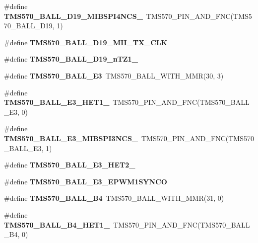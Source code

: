 \begin{DoxyCompactItemize}
\item 
\mbox{\label{tms570lc4357-pins_8h_a776e34c42339fee359bb9077e2f3d977}} 
\#define {\bfseries T\+M\+S570\+\_\+\+B\+A\+L\+L\+\_\+\+D19\+\_\+\+M\+I\+B\+S\+P\+I4\+N\+C\+S\+\_}~T\+M\+S570\+\_\+\+P\+I\+N\+\_\+\+A\+N\+D\+\_\+\+F\+NC(T\+M\+S570\+\_\+\+B\+A\+L\+L\+\_\+\+D19, 1)
\item 
\#define {\bfseries T\+M\+S570\+\_\+\+B\+A\+L\+L\+\_\+\+D19\+\_\+\+M\+I\+I\+\_\+\+T\+X\+\_\+\+C\+LK}
\item 
\#define {\bfseries T\+M\+S570\+\_\+\+B\+A\+L\+L\+\_\+\+D19\+\_\+n\+T\+Z1\+\_}
\item 
\mbox{\label{tms570lc4357-pins_8h_aacdf78b66d5fde059737a66c86631960}} 
\#define {\bfseries T\+M\+S570\+\_\+\+B\+A\+L\+L\+\_\+\+E3}~T\+M\+S570\+\_\+\+B\+A\+L\+L\+\_\+\+W\+I\+T\+H\+\_\+\+M\+MR(30, 3)
\item 
\mbox{\label{tms570lc4357-pins_8h_adb0461589f731e79535d849af9ccc705}} 
\#define {\bfseries T\+M\+S570\+\_\+\+B\+A\+L\+L\+\_\+\+E3\+\_\+\+H\+E\+T1\+\_}~T\+M\+S570\+\_\+\+P\+I\+N\+\_\+\+A\+N\+D\+\_\+\+F\+NC(T\+M\+S570\+\_\+\+B\+A\+L\+L\+\_\+\+E3, 0)
\item 
\mbox{\label{tms570lc4357-pins_8h_a0a8e702711a0a0037a5e4eb53fe198a2}} 
\#define {\bfseries T\+M\+S570\+\_\+\+B\+A\+L\+L\+\_\+\+E3\+\_\+\+M\+I\+B\+S\+P\+I3\+N\+C\+S\+\_}~T\+M\+S570\+\_\+\+P\+I\+N\+\_\+\+A\+N\+D\+\_\+\+F\+NC(T\+M\+S570\+\_\+\+B\+A\+L\+L\+\_\+\+E3, 1)
\item 
\#define {\bfseries T\+M\+S570\+\_\+\+B\+A\+L\+L\+\_\+\+E3\+\_\+\+H\+E\+T2\+\_}
\item 
\#define {\bfseries T\+M\+S570\+\_\+\+B\+A\+L\+L\+\_\+\+E3\+\_\+\+E\+P\+W\+M1\+S\+Y\+N\+CO}
\item 
\mbox{\label{tms570lc4357-pins_8h_ae136a42d7821ad27bd9a294b6d3a4e64}} 
\#define {\bfseries T\+M\+S570\+\_\+\+B\+A\+L\+L\+\_\+\+B4}~T\+M\+S570\+\_\+\+B\+A\+L\+L\+\_\+\+W\+I\+T\+H\+\_\+\+M\+MR(31, 0)
\item 
\mbox{\label{tms570lc4357-pins_8h_a50b17dcdc4982823eebc83e5d2d91ad8}} 
\#define {\bfseries T\+M\+S570\+\_\+\+B\+A\+L\+L\+\_\+\+B4\+\_\+\+H\+E\+T1\+\_}~T\+M\+S570\+\_\+\+P\+I\+N\+\_\+\+A\+N\+D\+\_\+\+F\+NC(T\+M\+S570\+\_\+\+B\+A\+L\+L\+\_\+\+B4, 0)

\end{DoxyCompactItemize}

